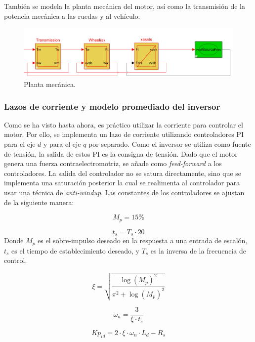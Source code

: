 También se modela la planta mecánica del motor, así como la transmisión de la potencia mecánica a las ruedas y al vehículo.

\begin{figure}[H]
    \centering
    \includegraphics[width=0.95\linewidth]{fig/carEMR.png}
    \caption{Planta mecánica.}
\end{figure}

\subsubsection{Lazos de corriente y modelo promediado del inversor}

Como se ha visto hasta ahora, es práctico utilizar la corriente para controlar el motor. Por ello, se implementa un lazo de corriente utilizando controladores PI para el eje $d$ y para el eje $q$ por separado. Como el inversor se utiliza como fuente de tensión, la salida de estos PI es la consigna de tensión. Dado que el motor genera una fuerza contraelectromotriz, se añade como \textit{feed-forward} a los controladores. La salida del controlador no se satura directamente, sino que se implementa una saturación posterior la cual se realimenta al controlador para usar una técnica de \textit{anti-windup}. Las constantes de los controladores se ajustan de la siguiente manera:

\[
M_p = 15 \%
\]

\[
 t_s = T_s \cdot 20
\]
Donde $M_p$ es el sobre-impulso deseado en la respuesta a una entrada de escalón, $t_s$ es el tiempo de establecimiento deseado, y $T_s$ es la inversa de la frecuencia de control.

\begin{equation}
	\xi = \sqrt{\frac{\log(M_p)^2}{\pi^2 + \log(M_p)^2}}
\end{equation}

\begin{equation}
\omega_n = \frac{3}{\xi \cdot t_s}
\end{equation}

\begin{equation}
Kp_{id} = 2 \cdot \xi \cdot \omega_n \cdot L_d - R_s
\end{equation}

